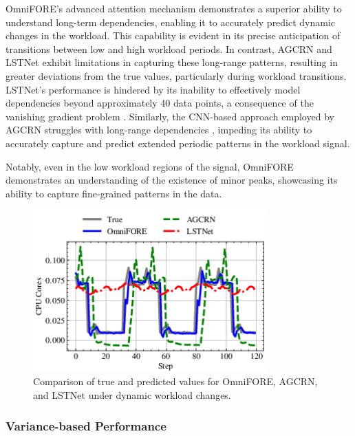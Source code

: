 \documentclass{ieeetmlcn}
\begin{document}
OmniFORE's advanced attention mechanism demonstrates a superior ability to understand long-term dependencies, enabling it to accurately predict dynamic changes in the workload. This capability is evident in its precise anticipation of transitions between low and high workload periods. In contrast, AGCRN and LSTNet exhibit limitations in capturing these long-range patterns, resulting in greater deviations from the true values, particularly during workload transitions. LSTNet's performance is hindered by its inability to effectively model dependencies beyond approximately 40 data points, a consequence of the vanishing gradient problem \cite{zhou2021informer}. Similarly, the CNN-based approach employed by AGCRN struggles with long-range dependencies \cite{acmtimeseriesreview2024, hochreiter1998vanishing}, impeding its ability to accurately capture and predict extended periodic patterns in the workload signal.

Notably, even in the low workload regions of the signal, OmniFORE demonstrates an understanding of the existence of minor peaks, showcasing its ability to capture fine-grained patterns in the data.

\begin{figure}\centering
\centering
\centering\includegraphics[width=0.8\textwidth]{img/dynamic_workload_changes.png}
\caption{Comparison of true and predicted values for OmniFORE, AGCRN, and LSTNet under dynamic workload changes.}
\label{fig:dynamic_workload_changes}
\end{figure}

\subsubsection{\textbf{Variance-based Performance}}
\end{document}
